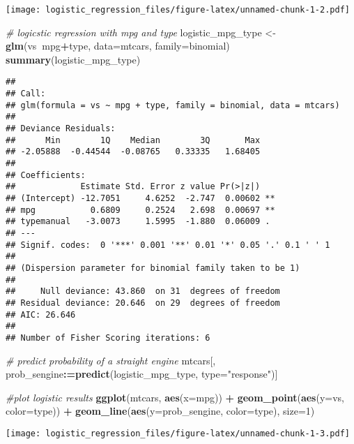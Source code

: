 \documentclass[]{article}
\newenvironment{Shaded}{\begin{snugshade}}{\end{snugshade}}
\newcommand{\KeywordTok}[1]{\textcolor[rgb]{0.13,0.29,0.53}{\textbf{#1}}}
\newcommand{\DataTypeTok}[1]{\textcolor[rgb]{0.13,0.29,0.53}{#1}}
\newcommand{\DecValTok}[1]{\textcolor[rgb]{0.00,0.00,0.81}{#1}}
\newcommand{\StringTok}[1]{\textcolor[rgb]{0.31,0.60,0.02}{#1}}
\newcommand{\CommentTok}[1]{\textcolor[rgb]{0.56,0.35,0.01}{\textit{#1}}}
\newcommand{\OperatorTok}[1]{\textcolor[rgb]{0.81,0.36,0.00}{\textbf{#1}}}
\newcommand{\ErrorTok}[1]{\textcolor[rgb]{0.64,0.00,0.00}{\textbf{#1}}}
\newcommand{\NormalTok}[1]{#1}
\begin{document}
\texttt{[image: logistic\_regression\_files/figure-latex/unnamed-chunk-1-2.pdf]}

\begin{Shaded}
\begin{Highlighting}[]
\CommentTok{# logicstic regression with mpg and type}
\NormalTok{logistic_mpg_type <-}\StringTok{ }\KeywordTok{glm}\NormalTok{(vs}\OperatorTok{~}\NormalTok{mpg}\OperatorTok{+}\NormalTok{type, }\DataTypeTok{data=}\NormalTok{mtcars, }\DataTypeTok{family=}\NormalTok{binomial)}
\KeywordTok{summary}\NormalTok{(logistic_mpg_type)}
\end{Highlighting}
\end{Shaded}

\begin{verbatim}
## 
## Call:
## glm(formula = vs ~ mpg + type, family = binomial, data = mtcars)
## 
## Deviance Residuals: 
##      Min        1Q    Median        3Q       Max  
## -2.05888  -0.44544  -0.08765   0.33335   1.68405  
## 
## Coefficients:
##             Estimate Std. Error z value Pr(>|z|)   
## (Intercept) -12.7051     4.6252  -2.747  0.00602 **
## mpg           0.6809     0.2524   2.698  0.00697 **
## typemanual   -3.0073     1.5995  -1.880  0.06009 . 
## ---
## Signif. codes:  0 '***' 0.001 '**' 0.01 '*' 0.05 '.' 0.1 ' ' 1
## 
## (Dispersion parameter for binomial family taken to be 1)
## 
##     Null deviance: 43.860  on 31  degrees of freedom
## Residual deviance: 20.646  on 29  degrees of freedom
## AIC: 26.646
## 
## Number of Fisher Scoring iterations: 6
\end{verbatim}

\begin{Shaded}
\begin{Highlighting}[]
\CommentTok{# predict probability of a straight engine}
\NormalTok{mtcars[, prob_sengine}\OperatorTok{:}\ErrorTok{=}\KeywordTok{predict}\NormalTok{(logistic_mpg_type, }\DataTypeTok{type=}\StringTok{"response"}\NormalTok{)]}

\CommentTok{#plot logistic results}
\KeywordTok{ggplot}\NormalTok{(mtcars, }\KeywordTok{aes}\NormalTok{(}\DataTypeTok{x=}\NormalTok{mpg)) }\OperatorTok{+}
\StringTok{  }\KeywordTok{geom_point}\NormalTok{(}\KeywordTok{aes}\NormalTok{(}\DataTypeTok{y=}\NormalTok{vs, }\DataTypeTok{color=}\NormalTok{type)) }\OperatorTok{+}
\StringTok{  }\KeywordTok{geom_line}\NormalTok{(}\KeywordTok{aes}\NormalTok{(}\DataTypeTok{y=}\NormalTok{prob_sengine, }\DataTypeTok{color=}\NormalTok{type), }\DataTypeTok{size=}\DecValTok{1}\NormalTok{)}
\end{Highlighting}
\end{Shaded}

\texttt{[image: logistic\_regression\_files/figure-latex/unnamed-chunk-1-3.pdf]}
\end{document}
